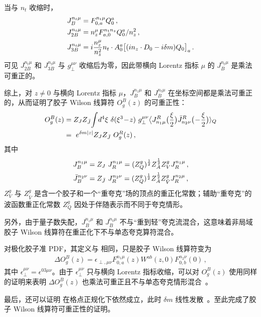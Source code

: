 当与 $n_t$ 收缩时，
\begin{align} \label{eq:gauxopt}
	J_{B}^{n_t\mu} &=F^{n_t\mu}_{0,a}Q_0^a\,,\nonumber\\
	J_{2B}^{n_t\mu} &=n_z^\mu F_{a,0}^{n_tn_z} Q_0^a/n_z^2\,,\nonumber\\
	J_{3B}^{n_t\mu}&= i{n_z^\mu\over n_z^2} n_t\cdot A_{0}^a \big[(in_z\cdot D_0-i\delta m)Q_0\big]_a\,.
\end{align}
可见 $J_{2B}^{n_t\mu}$ 和 $J_{3B}^{n_t\mu}$ 与 $g_{\perp}^{\mu\nu}$ 收缩后为零，因此带横向 Lorentz 指标 $\mu$ 的 $J_{B}^{n_t\mu}$ 是乘法可重正的。

综上，对 $z\neq0$ 与横向 Lorentz 指标 $\mu$，$J_{B}^{n_z\mu}$ 和 $J_{B}^{n_t\mu}$ 在坐标空间都是乘法可重正的，从而证明了胶子 Wilson 线算符 $O^B_g(z)$ 的可重正性：
\begin{align} \label{eq:renproofgluon}
	O^B_g(z)&=Z_{J}Z_{\bar{J}}\!\int\! d^4\xi\ \delta(\xi^3\!-\!z)\ g_{\perp}^{\mu\nu}\big\langle J_{n_1\mu}^{R}\big({\xi\over2}\big)\bar{J}_{n_2\nu}^{R}\big(\!-\!{\xi\over2}\big)\rangle_Q\nn\\
	&=\ e^{\delta m|z|} Z_{J}Z_{\bar{J}}\ O^R_g(z)\,,
\end{align}
其中
\begin{align}
	J_B^{n_1\mu}&=Z_{J}\ J_R^{n_1\mu}=(Z^g_Q)^{1\over 2}Z_A^{1\over 2}Z^g_V J_R^{n_1\mu}\,,\\
	\bar{J}_B^{n_2\nu}&=Z_{\bar{J}}\ J_R^{n_2\nu}=(Z^g_Q)^{1\over 2}Z_A^{1\over 2}Z^g_{\bar{V}} J_R^{n_2\mu}\,,
\end{align}
$Z^g_V$ 与 $Z^g_{\bar{V}}$ 是含一个胶子和一个``重夸克''场的顶点的重正化常数；辅助``重夸克''的波函数重正化常数 $Z^g_Q$ 因处于伴随表示而不同于夸克情形。

另外，由于量子数失配，$J_{B}^{n_z\mu}$ 和 $J_{B}^{n_t\mu}$ 不与``重到轻''夸克流混合，这意味着非局域胶子 Wilson 线算符在重正化下不与单态夸克算符混合。

\vspace{.3cm}
对极化胶子准 PDF，其定义与  相同，只是胶子 Wilson 线算符变为
\begin{align}
	\Delta O^B_g(z) = \epsilon_{\perp,\mu\nu} F^{n_1\mu}_{0,a}(z) W^{ab}(z,0) F^{n_2\nu}_{0,b}(0)\,,
\end{align}
其中 $\epsilon_{\perp}^{\mu\nu}=\epsilon^{03\mu\nu}$。由于 $\epsilon_{\perp}^{\mu\nu}$ 只与横向 Lorentz 指标收缩，可以对 $O^B_g(z)$ 使用同样的证明来表明 $\Delta O^B_g(z)$ 也乘法可重正且不与单态夸克情形混合~\cite{Zhang:2018diq}。

最后，还可以证明  在格点正规化下依然成立，此时 $\delta m$ 线性发散~\cite{Zhang:2018diq}。至此完成了胶子 Wilson 线算符可重正性的证明。

